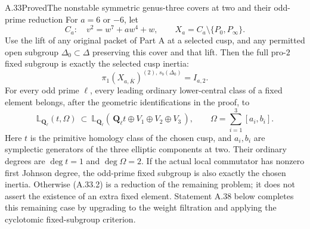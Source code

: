 \begin{statement}{A.33}{Proved}{The nonstable symmetric genus-three covers at two and their odd-prime reduction}
For $a=6$ or $-6$, let
\[
 C_a:\quad v^2=w^7+aw^4+w,\qquad
 X_a=C_a\setminus\{P_0,P_\infty\}.
\]
Use the lift of any original packet of Part A at a selected
cusp, and any permitted open subgroup $\Delta_0\subset\Delta$
preserving this cover and that lift. Then the full pro-$2$
fixed subgroup is exactly the selected cusp inertia:
\[
 \pi_1(X_{a,\overline K})^{(2),\,s_b(\Delta_0)}
                       =I_{a,2}.                       \tag{A.33.1}
\]
For every odd prime $\ell$, every leading ordinary
lower-central class of a fixed element belongs, after the
geometric identifications in the proof, to
\[
 \mathbb L_{\mathbf Q_\ell}(t,\Omega)
 \ \subset\
 \mathbb L_{\mathbf Q_\ell}
       (\,\mathbf Q_\ell t\oplus V_1\oplus V_2\oplus V_3\,),
 \qquad \Omega=\sum_{i=1}^3[a_i,b_i].                  \tag{A.33.2}
\]
Here $t$ is the primitive homology class of the chosen
cusp, and $a_i,b_i$ are symplectic generators of the three
elliptic components at two. Their ordinary degrees are
$\deg t=1$ and $\deg\Omega=2$.
If the actual local commutator has nonzero first Johnson
degree, the odd-prime fixed subgroup is also exactly
the chosen inertia. Otherwise (A.33.2) is a reduction
of the remaining problem; it does not assert the
existence of an extra fixed element.
Statement A.38 below completes this remaining case
by upgrading to the weight filtration and applying
the cyclotomic fixed-subgroup criterion.
\end{statement}
